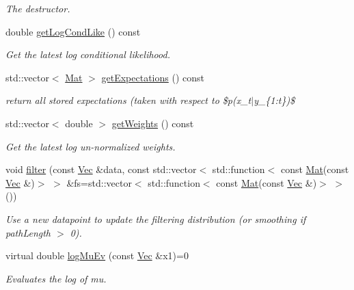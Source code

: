\begin{DoxyCompactItemize}
\begin{DoxyCompactList}\small\item\em The destructor. \end{DoxyCompactList}\item 
double \hyperlink{classAPFFilter_af9a5210f2927616dd6c82705d203b012}{get\+Log\+Cond\+Like} () const 
\begin{DoxyCompactList}\small\item\em Get the latest log conditional likelihood. \end{DoxyCompactList}\item 
std\+::vector$<$ \hyperlink{apf__filter_8h_ae601f56a556993079f730483c574356f}{Mat} $>$ \hyperlink{classAPFFilter_adf8af6603940182e0a42646cace2f233}{get\+Expectations} () const 
\begin{DoxyCompactList}\small\item\em return all stored expectations (taken with respect to \$p(x\+\_\+t$\vert$y\+\_\+\{1\+:t\})\$ \end{DoxyCompactList}\item 
std\+::vector$<$ double $>$ \hyperlink{classAPFFilter_a397d4b1b17e0ed2b8304d87c704efd84}{get\+Weights} () const 
\begin{DoxyCompactList}\small\item\em Get the latest log un-\/normalized weights. \end{DoxyCompactList}\item 
void \hyperlink{classAPFFilter_aa087692fec5a7aafa30f6ec9e6227697}{filter} (const \hyperlink{apf__filter_8h_a4c7df05c6f5e8a0d15ae14bcdbc07152}{Vec} \&data, const std\+::vector$<$ std\+::function$<$ const \hyperlink{apf__filter_8h_ae601f56a556993079f730483c574356f}{Mat}(const \hyperlink{apf__filter_8h_a4c7df05c6f5e8a0d15ae14bcdbc07152}{Vec} \&)$>$ $>$ \&fs=std\+::vector$<$ std\+::function$<$ const \hyperlink{apf__filter_8h_ae601f56a556993079f730483c574356f}{Mat}(const \hyperlink{apf__filter_8h_a4c7df05c6f5e8a0d15ae14bcdbc07152}{Vec} \&)$>$ $>$())
\begin{DoxyCompactList}\small\item\em Use a new datapoint to update the filtering distribution (or smoothing if path\+Length $>$ 0). \end{DoxyCompactList}\item 
virtual double \hyperlink{classAPFFilter_af3d1501c147477ce1128b221f7b608fd}{log\+Mu\+Ev} (const \hyperlink{apf__filter_8h_a4c7df05c6f5e8a0d15ae14bcdbc07152}{Vec} \&x1)=0
\begin{DoxyCompactList}\small\item\em Evaluates the log of mu. \end{DoxyCompactList}\item 

\end{DoxyCompactItemize}
